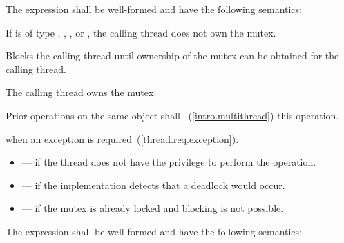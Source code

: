 \pnum
The expression  shall be well-formed and have the following semantics:

\begin{itemdescr}
\pnum
\requires If  is of type , ,
, or , the calling
thread does not own the mutex.

\pnum
\effects Blocks the calling thread until ownership of the mutex can be obtained for the calling thread.

\pnum
\postcondition The calling thread owns the mutex.

\pnum
\returntype {}

\pnum
\sync Prior  operations on the same object shall
~(\ref{intro.multithread}) this operation.

\pnum
\throws {} when
an exception is required~(\ref{thread.req.exception}).

\pnum \errors
\begin{itemize}
\item {} --- if the thread does not have the
privilege to perform the operation.

\item {} --- if the implementation detects
that a deadlock would occur.

\item {} --- if the mutex is already locked and blocking is not possible.
\end{itemize}
\end{itemdescr}

\pnum
The expression  shall be well-formed and have the following semantics:

